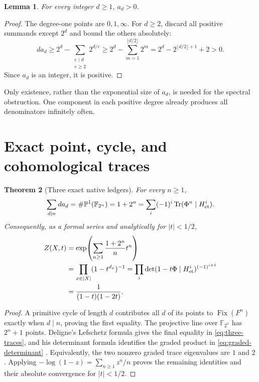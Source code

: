 \documentclass[11pt]{article}
\newtheorem{theorem}{Theorem}
\newtheorem{lemma}[theorem]{Lemma}
\theoremstyle{remark}\newtheorem{remark}[theorem]{Remark}
\newcommand{\F}{\mathbb F}
\newcommand{\Tr}{\operatorname{Tr}}
\newcommand{\e}{\mathrm e}
\begin{document}
\begin{lemma}\label{lem:degrees}
For every integer \(d\ge1\), \(a_d>0\).
\end{lemma}
\begin{proof}
The degree-one points are \(0,1,\infty\).  For \(d\ge2\), discard all
positive summands except \(2^d\) and bound the others absolutely:
\[
 d a_d\ge 2^d-\sum_{\substack{e\mid d\\e\ge2}}2^{d/e}
 \ge2^d-\sum_{m=1}^{\lfloor d/2\rfloor}2^m
 =2^d-2^{\lfloor d/2\rfloor+1}+2>0.
\]
Since \(a_d\) is an integer, it is positive.
\end{proof}

Only existence, rather than the exponential size of \(a_d\), is needed for
the spectral obstruction.  One component in each positive degree already
produces all denominators infinitely often.

\section{Exact point, cycle, and cohomological traces}

\begin{theorem}[Three exact native ledgers]\label{thm:ledgers}
For every \(n\ge1\),
\begin{equation}
 \sum_{d\mid n}d a_d
 =\#\mathbb P^1(\F_{2^n})
 =1+2^n
 =\sum_i(-1)^i\Tr(\Phi^n\mid H^i_{\rm et}).
 \label{eq:three-traces}
\end{equation}
Consequently, as a formal series and analytically for \(|t|<1/2\),
\begin{equation}
 \begin{split}
 Z(X,t)
 &=\exp\!\left(\sum_{n\ge1}\frac{1+2^n}{n}t^n\right)\\
 &=\prod_{x\in|X|}(1-t^{d_x})^{-1}
 =\prod_i\det(1-t\Phi\mid H^i_{\rm et})^{(-1)^{i+1}}\\
 &=\frac1{(1-t)(1-2t)}.
 \end{split}\label{eq:graded-determinant}
\end{equation}
\end{theorem}

\begin{proof}
A primitive cycle of length \(d\) contributes all \(d\) of its points to
\(\operatorname{Fix}(F^n)\) exactly when \(d\mid n\), proving the first
equality.  The projective line over \(\F_{2^n}\) has \(2^n+1\) points.
Deligne's Lefschetz formula gives the final equality in
\eqref{eq:three-traces}, and his determinant formula identifies the graded
product in \eqref{eq:graded-determinant}
\citep[Eqs.~(1.5.1)--(1.5.4)]{Deligne1974}.  Equivalently, the two nonzero
graded trace eigenvalues are \(1\) and \(2\).  Applying
\(-\log(1-z)=\sum_{n\ge1}z^n/n\) proves the remaining identities and their
absolute convergence for \(|t|<1/2\).
\end{proof}
\end{document}
